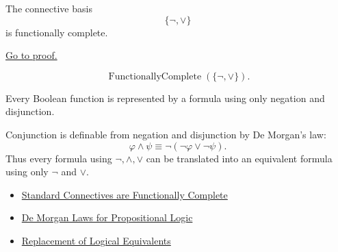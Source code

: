 \begin{tcolorbox}[colback=thmbox, colframe=thmborder, arc=2pt,
  left=6pt, right=6pt, top=4pt, bottom=4pt,
  title={\small\textbf{Theorem (Negation and Disjunction are Functionally Complete)}},
  fonttitle=\small\bfseries]
\begin{theorem}
\label{thm:negation-disjunction-functionally-complete-propositional-logic}
The connective basis
\[
\{\neg,\lor\}
\]
is functionally complete.

\noindent\hyperref[prf:negation-disjunction-functionally-complete-propositional-logic]{Go to proof.}
\end{theorem}
\end{tcolorbox}

\begin{remark*}
\[
\operatorname{FunctionallyComplete}(\{\neg,\lor\}).
\]
\end{remark*}

\begin{remark*}
Every Boolean function is represented by a formula using only negation and
disjunction.
\end{remark*}

\begin{remark*}[Interpretation]
Conjunction is definable from negation and disjunction by De Morgan's law:
\[
\varphi\land\psi\equiv\neg(\neg\varphi\lor\neg\psi).
\]
Thus every formula using \(\neg,\land,\lor\) can be translated into an equivalent
formula using only \(\neg\) and \(\lor\).
\end{remark*}

\begin{dependencies}
\begin{itemize}
  \item \hyperref[thm:standard-connectives-functionally-complete-propositional-logic]{Standard Connectives are Functionally Complete}
  \item \hyperref[thm:de-morgan-laws-propositional-logic]{De Morgan Laws for Propositional Logic}
  \item \hyperref[thm:replacement-of-logical-equivalents-propositional-logic]{Replacement of Logical Equivalents}
\end{itemize}
\end{dependencies}
